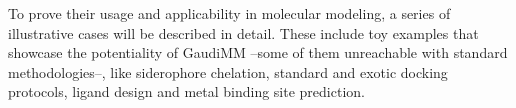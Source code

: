 To prove their usage and applicability in molecular modeling, a series of illustrative cases will be described in detail. These include toy examples that showcase the potentiality of GaudiMM –some of them unreachable with standard methodologies–, like siderophore chelation, standard and exotic docking protocols, ligand design and metal binding site prediction.